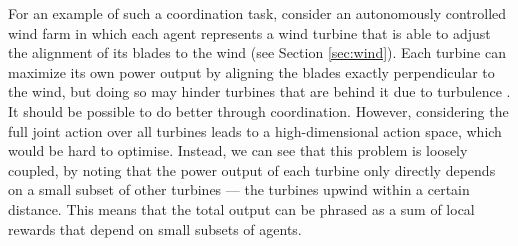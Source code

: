 \documentclass{article}
\begin{document}
%

For an example of such a coordination task, consider an autonomously controlled wind farm in which
each agent represents a wind turbine that is able to adjust the alignment of its blades to the wind
(see Section \ref{sec:wind}). Each turbine can maximize its own power output by aligning the
blades exactly perpendicular to the wind, but doing so may hinder turbines that are behind
it due to turbulence \cite{vandijk2016}. It should be possible to do better through coordination.
However, considering the full joint action over all turbines leads to a high-dimensional
action space, which would be hard to optimise. Instead, we can see that this problem is loosely coupled,
by noting that the power output of each turbine only directly depends on a small subset of other
turbines --- the turbines upwind within a certain distance. This means that the
total output can be phrased as a sum of local rewards that depend on small
subsets of agents.
\end{document}
